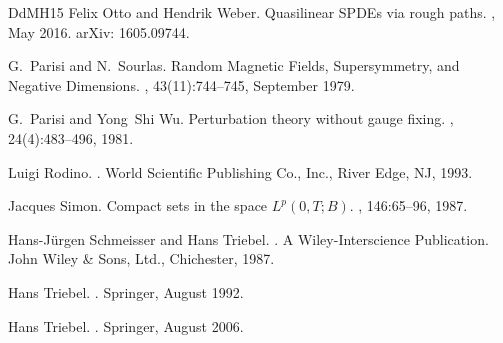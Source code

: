 \documentclass[a4paper,11pt]{article}
\numberwithin{equation}{section}
\newcommand{\8}{\infty}
\begin{document}
\begin{thebibliography}{DdMH15}
Felix Otto and Hendrik Weber.
\newblock Quasilinear {SPDEs} via rough paths.
, May 2016.
\newblock arXiv: 1605.09744.

G.~Parisi and N.~Sourlas.
\newblock Random {Magnetic} {Fields}, {Supersymmetry}, and {Negative}
  {Dimensions}.
, 43(11):744--745, September 1979.

G.~Parisi and Yong~Shi Wu.
\newblock Perturbation theory without gauge fixing.
, 24(4):483--496, 1981.

Luigi Rodino.
.
\newblock World Scientific Publishing Co., Inc., River Edge, NJ, 1993.

Jacques Simon.
\newblock Compact sets in the space {$L^p(0,T;B)$}.
, 146:65--96, 1987.

Hans-J\"urgen Schmeisser and Hans Triebel.
.
\newblock A Wiley-Interscience Publication. John Wiley \& Sons, Ltd.,
  Chichester, 1987.

Hans Triebel.
.
\newblock Springer, August 1992.

Hans Triebel.
.
\newblock Springer, August 2006.

\end{thebibliography}
\end{document}
